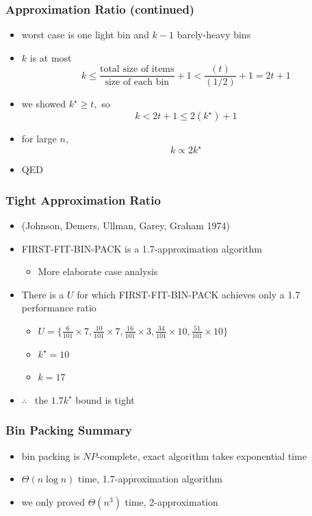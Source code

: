 \documentclass[10pt,aspectratio=169]{beamer}
\begin{document}
\begin{frame} \frametitle{Approximation Ratio (continued)}
  \begin{itemize}
    \item worst case is one light bin and $k-1$ barely-heavy bins
    \item $k$ is at most
      \[ k \leq \frac{\text{total size of items}}{\text{size of each bin}} + 1 < \frac{(t)}{(1/2)} + 1 = 2t+1 \]
    \item we showed $k^\star \geq t,$ so
      \[ k < 2t+1 \leq 2(k^\star)+1 \]
    \item for large $n,$
      \[ k \propto 2 k^\star \]
    \item QED
  \end{itemize}
\end{frame}
    
\begin{frame} \frametitle{Tight Approximation Ratio}
  \begin{itemize}
    \item (Johnson, Demers, Ullman, Garey, Graham 1974)
    \item FIRST-FIT-BIN-PACK is a 1.7-approximation algorithm
    \begin{itemize}
      \item More elaborate case analysis
    \end{itemize}
    \item There is a $U$ for which FIRST-FIT-BIN-PACK achieves only a 1.7 performance ratio
    \begin{itemize}
      \item $U = \{ \frac{6}{101} \times 7, \frac{10}{101} \times 7, \frac{16}{101} \times 3, \frac{34}{101} \times 10, \frac{51}{101} \times 10 \}$
      \item $k^\star = 10$
      \item $k = 17$
    \end{itemize}
    \item $\therefore \enspace$ the $1.7 k^\star$ bound is tight
  \end{itemize}
\end{frame}

\begin{frame} \frametitle{Bin Packing Summary}
\begin{itemize}
  \item bin packing is $NP$-complete, exact algorithm takes exponential time
  \item $\Theta(n \log n)$ time, 1.7-approximation algorithm
  \item we only proved $\Theta(n^3)$ time, 2-approximation
\end{itemize}
\end{frame}
\end{document}
